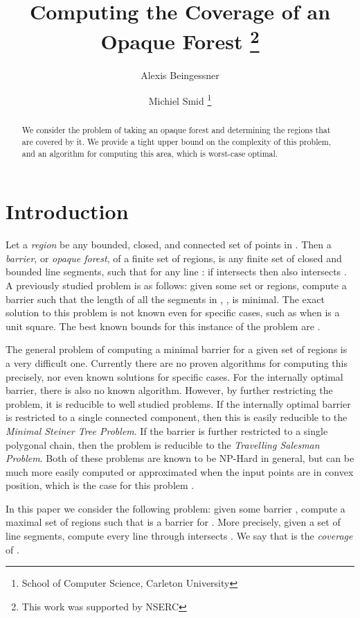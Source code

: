 \documentclass{cccg12}
\title{Computing the Coverage of an Opaque Forest \thanks{This work was supported by NSERC}}
\author{Alexis Beingessner \and Michiel Smid \thanks{School of Computer Science, Carleton University}}
\begin{document}
\thispagestyle{empty}
\maketitle



\begin{abstract}
We consider the problem of taking an opaque forest and determining the regions that are covered by it. We provide a tight upper bound on the complexity of this problem, and an algorithm for computing this area, which is worst-case optimal.
\end{abstract}




\section{Introduction}
Let a \emph{region} be any bounded, closed, and connected set of points in . Then a \emph{barrier}, or \emph{opaque forest}, of a finite set  of regions, is any finite set  of closed and bounded line segments, such that for any line : if  intersects  then  also intersects . A previously studied problem is as follows: given some set  or regions, compute a barrier  such that the length of all the segments in , , is minimal. The exact solution to this problem is not known even for specific cases, such as when  is a unit square. The best known bounds for this instance of the problem are . \cite{Dumitrescu2010}

The general problem of computing a minimal barrier for a given set of regions is a very difficult one. Currently there are no proven algorithms for computing this precisely, nor even known solutions for specific cases. For the internally optimal barrier, there is also no known algorithm. However, by further restricting the problem, it is reducible to well studied problems. If the internally optimal barrier is restricted to a single connected component, then this is easily reducible to the \emph{Minimal Steiner Tree Problem}. If the barrier is further restricted to a single polygonal chain, then the problem is reducible to the \emph{Travelling Salesman Problem}. Both of these problems are known to be NP-Hard in general, but can be much more easily computed or approximated when the input points are in convex position, which is the case for this problem \cite{Dumitrescu2010}.

In this paper we consider the following problem: given some barrier , compute a maximal set  of regions such that  is a barrier for . More precisely, given a set  of  line segments, compute  every line through  intersects . We say that  is the \emph{coverage} of .
\end{document}
